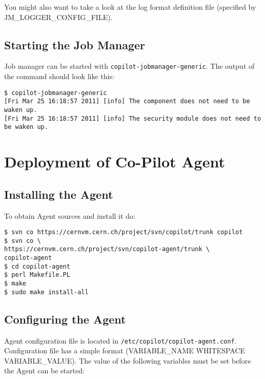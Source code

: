 You might also want to take a look at the log format definition file (specified by JM\_LOGGER\_CONFIG\_FILE).

\subsection{Starting the Job Manager}

Job manager can be started with \texttt{copilot-jobmanager-generic}. The output of the command should look like this:

\lstset{caption=Starting \copilot Generic Job Manager}
\begin{lstlisting}
$ copilot-jobmanager-generic
[Fri Mar 25 16:18:57 2011] [info] The component does not need to be waken up.
[Fri Mar 25 16:18:57 2011] [info] The security module does not need to be waken up.

\end{lstlisting}

\section{Deployment of Co-Pilot Agent}

\subsection{Installing the Agent}
To obtain Agent sources and install it do:

\lstset{caption=\copilot Agent installation}
\begin{lstlisting}
$ svn co https://cernvm.cern.ch/project/svn/copilot/trunk copilot
$ svn co \
https://cernvm.cern.ch/project/svn/copilot-agent/trunk \
copilot-agent
$ cd copilot-agent
$ perl Makefile.PL
$ make
$ sudo make install-all
\end{lstlisting}

\subsection{Configuring the Agent}
Agent configuration file is located in \texttt{/etc/copilot/copilot-agent.conf}. Configuration file has a simple format (VARIABLE\_NAME WHITESPACE VARIABLE\_VALUE).
The value of the following variables must be set before the Agent can be started:

